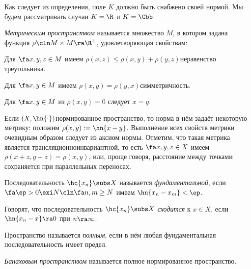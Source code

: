 \documentclass[a4paper]{article}
\begin{document}
Как следует из определения, поле $K$ должно быть снабжено своей нормой. Мы будем рассматривать
случаи $K = \R$ и $K = \Cbb$.

\begin{df}
\emph{Метрическим пространством} называется множество $M$, в котором задана функция $\rho\cln M \times M \ra \R^+$,
удовлетворяющая свойствам:
\begin{points}{-3}
\item Для $\fa x, y, z \in M$ имеем $\rho(x,z) \le \rho(x,y) + \rho(y,z)$\т неравенство треугольника.
\item Для $\fa x, y \in M$ имеем $\rho(x,y) = \rho(y,x)$\т симметричность.
\item Для $\fa x, y \in M$ из $\rho(x,y) = 0$ следует $x = y$.
\end{points}
\end{df}

Если $(X, \hn{\cdot})$\т нормированное пространство, то норма в нём задаёт некоторую метрику:
положим $\rho(x,y) := \hn{x-y}$. Выполнение всех свойств метрики очевидным образом следует
из аксиом нормы. Отметим, что такая метрика является трансляционно\д инвариантной, то
есть $\fa x, y, z \in X$ имеем $\rho(x + z, y + z) = \rho(x,y)$, или, проще говоря, расстояние
между точками сохраняется при параллельных переносах.

\begin{df}
Последовательность $\hc{x_n} \subs X$ называется \emph{фундаментальной}, если $\fa \ep > 0 \exi N\cln
\fa n, m \ge N$ имеем $\hn{x_n - x_m} < \ep$.
\end{df}

\begin{df}
Говорят, что последовательность $\hc{x_n} \subs X$ \emph{сходится} к $x \in X$,
если $\hn{x_n - x} \ra 0$ при $n \ra \infty$.
\end{df}

\begin{df}
Пространство называется \emph{полным}, если в нём любая фундаментальная
последовательность имеет предел.
\end{df}

\begin{df}
\emph{Банаховым пространством} называется полное нормированное пространство.
\end{df}
\end{document}
